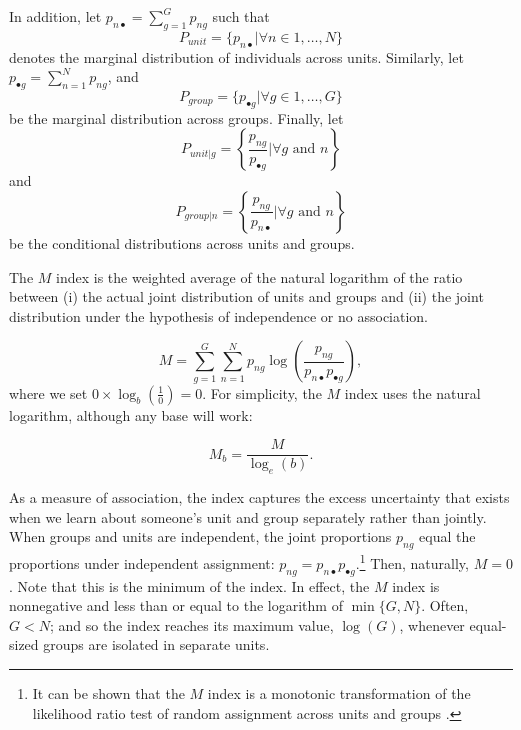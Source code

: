 In addition, let $p_{n \bullet} = \sum_{g=1}^{G}p_{ng}$ such that
\begin{equation}
P_{unit} = \{p_{n\bullet}| \forall n \in 1,\ldots,N\} \label{eq: marg_unit}
\end{equation}
denotes the marginal distribution of individuals across units. Similarly, let $p_{\bullet g} = \sum_{n=1}^{N} p_{ng}$, and
\begin{equation}
P_{group} = \{p_{\bullet g}| \forall g \in 1,\ldots,G\} \label{eq: marg_group}
\end{equation}
be the marginal distribution across groups. Finally, let
\begin{equation}
P_{unit|g} = \left\{\frac{p_{ng}}{ p_{\bullet g}}| \forall g \text{ and } n\right\} \label{cond_g}
\end{equation}
and
\begin{equation}
P_{group|n} = \left\{\frac{p_{ng}}{ p_{n\bullet}}| \forall g \text{ and } n\right\} \label{cond_n}
\end{equation}
be the conditional distributions across units and groups. 

The $M$ index is the weighted average of the natural logarithm of the ratio between (i) the actual joint distribution of units and groups and (ii) the joint distribution under the hypothesis of independence or no association.

\begin{equation}
    M = \sum_{g=1}^{G} \sum_{n=1}^{N} p_{ng} \log{ \left( \frac{p_{ng}}{p_{n \bullet} p_{\bullet g}} \right),}
    \label{eq: M-definition}
\end{equation}
where we set $0 \times \log_{b} \left( \frac{1}{0} \right) = 0$. For simplicity, the $M$ index uses the natural logarithm, although any base will work:

\begin{equation}
    M_b = \frac{M}{\log_e{\left(b\right)}}.
    \label{eq: M-base-change}
\end{equation}

As a measure of association, the index captures the excess uncertainty that exists when we learn about someone's unit and group separately rather than jointly. When groups and units are independent, the joint proportions $p_{ng}$ equal the proportions under independent assignment: $p_{ng} = p_{n \bullet} p_{\bullet g}$.\footnote{It can be shown that the $M$ index is a monotonic transformation of the likelihood ratio test of random assignment across units and groups \citep{zoloth_1974}.} Then, naturally, $M=0$. Note that this is the minimum of the index. In effect, the $M$ index is nonnegative and less than or equal to the logarithm of $\min \{G,N\}$. Often, $G < N$; and so the index reaches its maximum value, $\log(G)$, whenever equal-sized groups are isolated in separate units.

